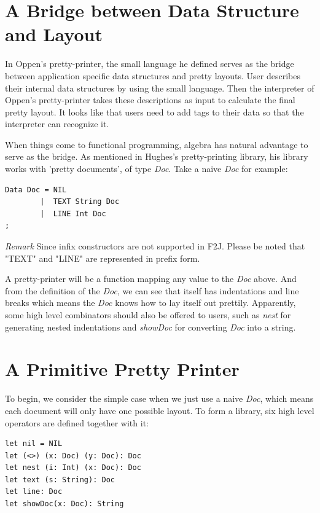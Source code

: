 \section{A Bridge between Data Structure and Layout}

In Oppen's pretty-printer\cite{oppen1980prettyprinting}, the small language he defined serves as the bridge between application specific data structures and pretty layouts. User describes their internal data structures by using the small language. Then the interpreter of Oppen's pretty-printer takes these descriptions as input to calculate the final pretty layout. It looks like that users need to add tags to their data so that the interpreter can recognize it.

When things come to functional programming, algebra has natural advantage to serve as the bridge. As mentioned in Hughes's pretty-printing library\cite{hughes1995design}, his library works with 'pretty documents', of type \textit{Doc}. Take a naive \textit{Doc} for example:

\begin{lstlisting}
Data Doc = NIL
        |  TEXT String Doc
        |  LINE Int Doc
;
\end{lstlisting}

\emph{Remark} Since infix constructors are not supported in F2J. Please be noted that "TEXT" and "LINE" are represented in prefix form.

A pretty-printer will be a function mapping any value to the \textit{Doc} above. And from the definition of the \textit{Doc}, we can see that itself has indentations and line breaks which means the \textit{Doc} knows how to lay itself out prettily. Apparently, some high level combinators should also be offered to users, such as \textit{nest} for generating nested indentations and \textit{showDoc} for converting \textit{Doc} into a string.

\section{A Primitive Pretty Printer}

To begin, we consider the simple case when we just use a naive \textit{Doc}, which means each document will only have one possible layout. To form a library, six high level operators are defined together with it:

\begin{lstlisting}
let nil = NIL
let (<>) (x: Doc) (y: Doc): Doc
let nest (i: Int) (x: Doc): Doc
let text (s: String): Doc
let line: Doc
let showDoc(x: Doc): String
\end{lstlisting}

